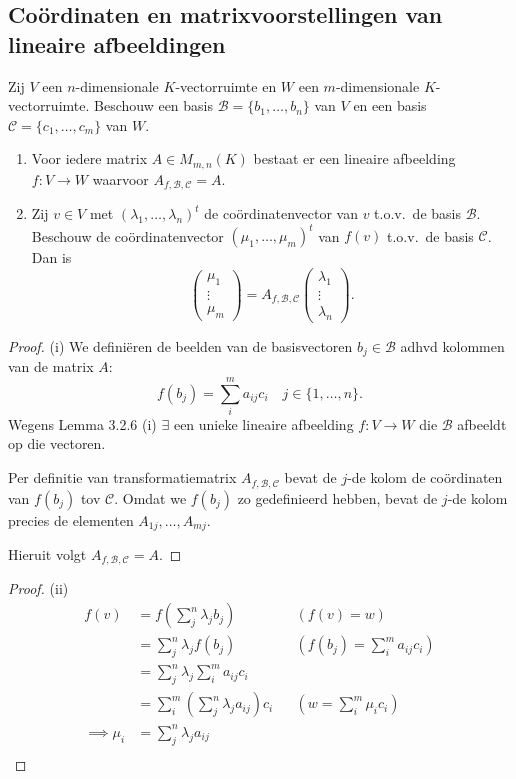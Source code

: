 \subsection{Coördinaten en matrixvoorstellingen van lineaire afbeeldingen}

\begin{lemma}[4.1.4]
    Zij $V$ een $n$-dimensionale $K$-vectorruimte en $W$ een $m$-dimensionale $K$-vectorruimte.
    Beschouw een basis $\mathcal{B} = \{b_1, \dots, b_n\}$ van $V$ en een basis $\mathcal{C} = \{c_1, \dots, c_m\}$ van $W$.
    \begin{enumerate}
        \item[(i)] Voor iedere matrix $A \in M_{m,n}(K)$ bestaat er een lineaire afbeelding $f \colon V \to W$ waarvoor $A_{f,\mathcal{B},\mathcal{C}} = A$.
        \item[(ii)] Zij $v \in V$ met $(\lambda_1, \dots, \lambda_n)^t$ de coördinatenvector van $v$ t.o.v.\ de basis $\mathcal{B}$.
        Beschouw de coördinatenvector $(\mu_1, \dots, \mu_m)^t$ van $f(v)$ t.o.v.\ de basis $\mathcal{C}$.
        Dan is \[ \begin{pmatrix} \mu_1 \\ \vdots \\ \mu_m \end{pmatrix} = A_{f,\mathcal{B},\mathcal{C}} \begin{pmatrix} \lambda_1 \\ \vdots \\ \lambda_n \end{pmatrix}. \]
    \end{enumerate}
\end{lemma}
\begin{proof}(i)
    We definiëren de beelden van de basisvectoren $b_j \in \mathcal{B}$ adhvd kolommen van de matrix $A$:
    \[f(b_j) = \sum_{i}^m a_{ij} c_i \quad  j \in \{ 1, \dots, n\}.\]
    Wegens Lemma 3.2.6 (i) \(\exists\) een unieke lineaire afbeelding $f \colon V \to W$ die $\mathcal{B}$ afbeeldt op die vectoren. 

    Per definitie van transformatiematrix $A_{f,\mathcal{B},\mathcal{C}}$ bevat
    de $j$-de kolom de coördinaten van $f(b_j)$ tov $\mathcal{C}$.
    Omdat we $f(b_j)$ zo gedefinieerd hebben, bevat de $j$-de kolom
    precies de elementen $A_{1j}, \dots, A_{mj}$.

    Hieruit volgt $A_{f,\mathcal{B},\mathcal{C}} = A$.
\end{proof}
\begin{proof}(ii)
    \begin{align*}
        f(v)
        &= f\left(\sum_j^n\lambda_j b_j\right) && (f(v) = w)\\
        &= \sum_j^n\lambda_j f\left(b_j\right) && (f(b_j) = \sum_{i}^m a_{ij} c_i)\\
        &= \sum_j^n\lambda_j \sum_{i}^m a_{ij} c_i\\
        &= \sum_i^m\left(\sum_j^n\lambda_j  a_{ij}\right) c_i && (w = \sum_i^m \mu_i c_i)\\
        \implies \mu_i &= \sum_j^n\lambda_j a_{ij} \\
    \end{align*}
\end{proof}


